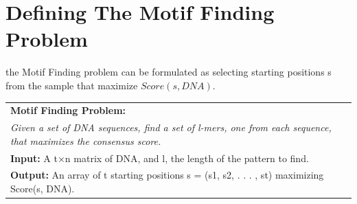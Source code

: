 \section{Defining The Motif Finding Problem}
the Motif Finding problem can be formulated as selecting starting positions s from the sample that maximize $ Score(s, DNA) $. 
\begin{table}[H]
	\begin{center}
		\begin{tabular}{p{300 pt}}
			\hline
			\textbf{Motif Finding Problem:}\\
			\textit{Given a set of DNA sequences, find a set of l-mers, one from each
			sequence, that maximizes the consensus score.}\\
		
			\textbf{Input:} A t×n matrix of DNA, and l, the length of the pattern
			to find.\\
			
			\textbf{Output:} An array of t starting positions s = (s1, s2, . . . , st)
			maximizing Score(s, DNA).\\
			\hline
		\end{tabular}
	\end{center}
\end{table}

\endinput